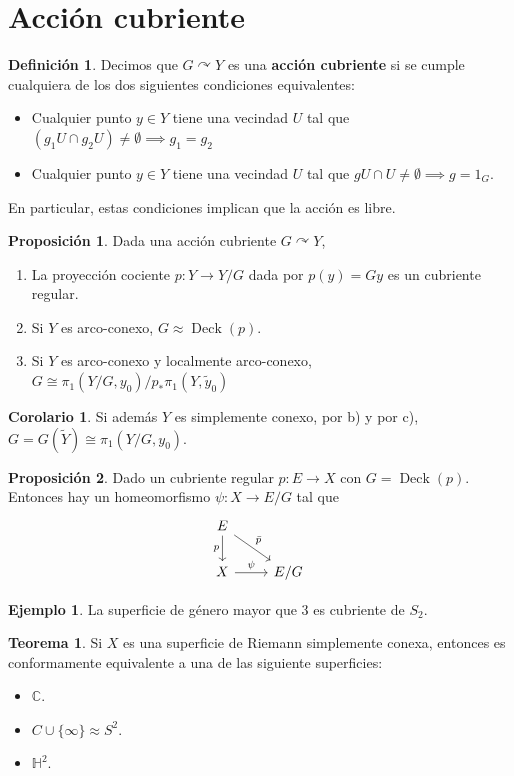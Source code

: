 \documentclass[spanish]{article}
\theoremstyle{definition}
\newtheorem*{defn}{Definición}
\newtheorem*{teo}{Teorema}
\newtheorem*{prop}{Proposición}
\newtheorem*{coro}{Corolario}
\newtheorem*{ejem}{Ejemplo}
\newcommand{\C}{\mathbb{C}}
\newcommand{\Hy}{\mathbb{H}}
\DeclareMathOperator{\Deck}{Deck}
\begin{document}
\section{Acción cubriente}
\begin{defn}
	Decimos que $G\curvearrowright Y$ es una \textbf{acción cubriente} si se cumple cualquiera de los dos siguientes condiciones equivalentes:
	\begin{itemize}
		\item Cualquier punto $y\in Y$ tiene una vecindad $U$ tal que $(g_1U\cap g_2U)\neq\emptyset\implies g_1=g_2$
		\item Cualquier punto $y\in Y$ tiene una vecindad $U$ tal que $gU\cap U\neq\emptyset\implies g=1_G$.
	\end{itemize}
	En particular, estas condiciones implican que la acción es libre.
\end{defn}
\begin{prop}
	Dada una acción cubriente $G\curvearrowright Y$,
	\begin{enumerate}[label=\alph*)]
		\item La proyección cociente $p:Y\to Y/G$ dada por $p(y)=Gy$ es un cubriente regular.
		\item Si $Y$ es arco-conexo, $G\approx\Deck(p)$.
		\item Si $Y$ es arco-conexo y localmente arco-conexo, $G\cong\pi_1(Y/G,y_0)/p_*\pi_1(Y,\tilde{y}_0)$
	\end{enumerate}
\end{prop}
\begin{coro}
	Si además $Y$ es simplemente conexo, por b) y por c), $G=G(\tilde{Y})\cong\pi_1(Y/G,y_0)$.
\end{coro}
\begin{prop}
	Dado un cubriente regular $p:E\to X$ con $G=\Deck(p)$. Entonces hay un homeomorfismo $\psi:X\to E/G$ tal que 
	\[\begin{tikzcd}
		E\arrow[d,swap,"p"]\arrow[rd,"\bar{p}"]\\
		X\arrow[r,"\psi"]&E/G
	\end{tikzcd}\]
\end{prop}
\begin{ejem}
	La superficie de género mayor que 3 es cubriente de $S_2$.
\end{ejem}
\begin{teo}
		Si $X$ es una superficie de Riemann simplemente conexa, entonces es conformamente equivalente a una de las siguiente superficies:
		\begin{itemize}
			\item $\C$.
			\item $C\cup \{\infty\}\approx S^2$.
			\item $\Hy^2$.
		\end{itemize}
\end{teo}
\end{document}
